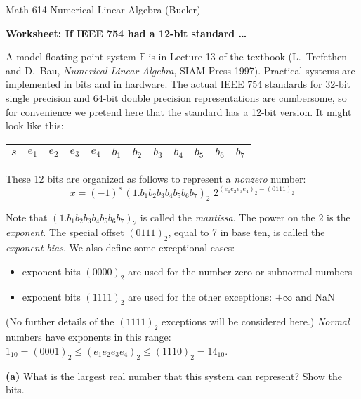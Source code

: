 \documentclass[12pt]{amsart}
\newcommand{\epart}[1]{\bigskip\noindent\textbf{(#1)}\quad }
\newcommand{\bitboxes}{
\large
\begin{center}
\begin{tabular}{|c|c|c|c|c|c|c|c|c|c|c|c|} \hline
\phantom{$e_1$} &
\phantom{$e_1$} &
\phantom{$e_1$} &
\phantom{$e_1$} &
\phantom{$e_1$} &
\phantom{$e_1$} &
\phantom{$e_1$} &
\phantom{$e_1$} &
\phantom{$e_1$} &
\phantom{$e_1$} &
\phantom{$e_1$} &
\phantom{$e_1$} \\ \hline
\end{tabular}
\end{center}
\normalsize}
\begin{document}
\scriptsize \noindent Math 614 Numerical Linear Algebra (Bueler) \hfill {}
\normalsize\medskip

\Large\centerline{\textbf{Worksheet: If IEEE 754 had a 12-bit standard \dots}}
\medskip
\normalsize

\thispagestyle{empty}

A model floating point system $\mathbb{F}$ is in Lecture 13 of the textbook (L.~Trefethen and D.~Bau, \emph{Numerical Linear Algebra}, SIAM Press 1997).  Practical systems are implemented in bits and in hardware.  The actual IEEE 754 standards for 32-bit single precision and 64-bit double precision representations are cumbersome, so for convenience we pretend here that the standard has a 12-bit version.  It might look like this:

\medskip\large
\begin{center}
\begin{tabular}{|c|c|c|c|c|c|c|c|c|c|c|c|} \hline
$s$ & $e_1$ & $e_2$ & $e_3$ & $e_4$ & $b_1$ & $b_2$ & $b_3$ & $b_4$ & $b_5$ & $b_6$ & $b_7$ \\ \hline
\end{tabular}
\end{center}
\medskip\normalsize

\noindent These 12 bits are organized as follows to represent a \emph{nonzero} number:
\medskip\large
	$$x = (-1)^s\,(1.b_1 b_2 b_3 b_4 b_5 b_6 b_7)_2 \,\, 2^{(e_1 e_2 e_3 e_4)_2 - (0111)_2}$$
\normalsize

\noindent Note that $(1.b_1 b_2 b_3 b_4 b_5 b_6 b_7)_2$ is called the \emph{mantissa}.  The power on the $2$ is the \emph{exponent}.  The special offset $(0111)_2$, equal to 7 in base ten, is called the \emph{exponent bias}.  We also define some exceptional cases:
\begin{itemize}
\item exponent bits $(0000)_2$ are used for the number zero or subnormal numbers
\item exponent bits $(1111)_2$ are used for the other exceptions: $\pm\infty$ and NaN
\end{itemize}
(No further details of the $(1111)_2$ exceptions will be considered here.)  \emph{Normal} numbers have exponents in this range: $1_{10} = (0001)_2 \le (e_1 e_2 e_3 e_4)_2 \le (1110)_2=14_{10}$.

\epart{a}  What is the largest real number that this system can represent?  Show the bits.

\bitboxes
\vfill
\end{document}
